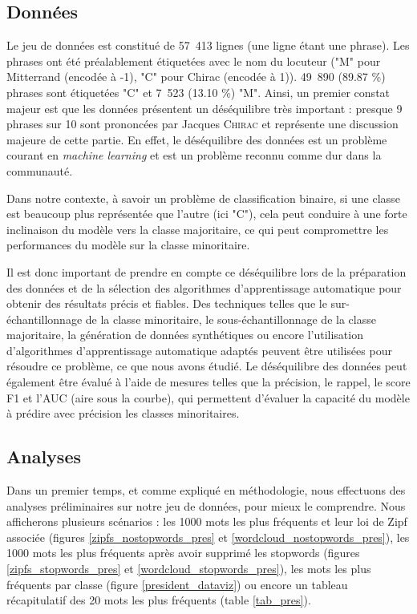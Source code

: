 \documentclass{article}
\begin{document}
\subsection{Données}

Le jeu de données est constitué de 57~413 lignes (une ligne étant une phrase). Les phrases ont été préalablement étiquetées avec le nom du locuteur ("M" pour Mitterrand (encodée à -1), "C" pour Chirac (encodée à 1)). 49~890 (89.87 \%) phrases sont étiquetées "C"  et 7~523 (13.10 \%) "M". Ainsi, un premier constat majeur est que les données présentent un déséquilibre très important : presque 9 phrases sur 10 sont prononcées par Jacques \textsc{Chirac} et représente une discussion majeure de cette partie. En effet, le déséquilibre des données est un problème courant en \textit{machine learning} et est un problème reconnu comme dur dans la communauté. 

Dans notre contexte, à savoir un problème de classification binaire, si une classe est beaucoup plus représentée que l'autre (ici "C"), cela peut conduire à une forte inclinaison du modèle vers la classe majoritaire, ce qui peut compromettre les performances du modèle sur la classe minoritaire.

Il est donc important de prendre en compte ce déséquilibre lors de la préparation des données et de la sélection des algorithmes d'apprentissage automatique pour obtenir des résultats précis et fiables. Des techniques telles que le sur-échantillonnage de la classe minoritaire, le sous-échantillonnage de la classe majoritaire, la génération de données synthétiques ou encore l'utilisation d'algorithmes d'apprentissage automatique adaptés peuvent être utilisées pour résoudre ce problème, ce que nous avons étudié. Le déséquilibre des données peut également être évalué à l'aide de mesures telles que la précision, le rappel, le score F1 et l'AUC (aire sous la courbe), qui permettent d'évaluer la capacité du modèle à prédire avec précision les classes minoritaires.



\subsection{Analyses}

Dans un premier temps, et comme expliqué en méthodologie, nous effectuons des analyses préliminaires sur notre jeu de données, pour mieux le comprendre. Nous afficherons plusieurs scénarios : les 1000 mots les plus fréquents et leur loi de Zipf associée (figures \ref{zipfs_nostopwords_pres} et \ref{wordcloud_nostopwords_pres}), les 1000 mots les plus fréquents après avoir supprimé les stopwords (figures \ref{zipfs_stopwords_pres} et \ref{wordcloud_stopwords_pres}), les mots les plus fréquents par classe (figure \ref{president_dataviz}) ou encore un tableau récapitulatif des 20 mots les plus fréquents (table \ref{tab_pres}).
\end{document}
